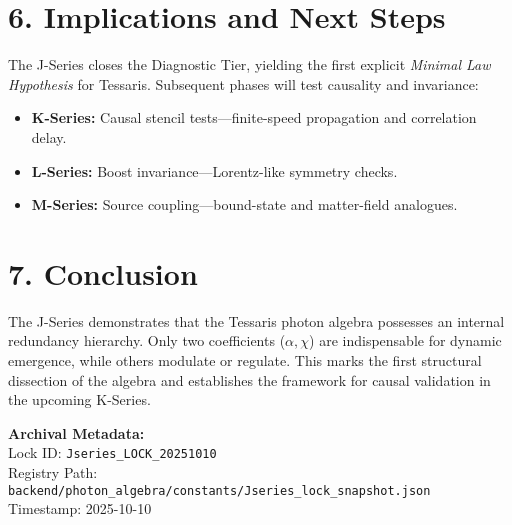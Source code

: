 \documentclass[12pt]{article}
\begin{document}
\section*{6. Implications and Next Steps}

The J-Series closes the Diagnostic Tier, yielding the first explicit \emph{Minimal Law Hypothesis} for Tessaris.
Subsequent phases will test causality and invariance:

\begin{itemize}
  \item \textbf{K-Series:} Causal stencil tests—finite-speed propagation and correlation delay.
  \item \textbf{L-Series:} Boost invariance—Lorentz-like symmetry checks.
  \item \textbf{M-Series:} Source coupling—bound-state and matter-field analogues.
\end{itemize}

\section*{7. Conclusion}

The J-Series demonstrates that the Tessaris photon algebra possesses an internal redundancy hierarchy.
Only two coefficients (\(\alpha, \chi\)) are indispensable for dynamic emergence, while others modulate or regulate.
This marks the first structural dissection of the algebra and establishes the framework for causal validation in the upcoming K-Series.

\vspace{1em}
\noindent\textbf{Archival Metadata:}\\
Lock ID: \texttt{Jseries\_LOCK\_20251010}\\
Registry Path: \texttt{backend/photon\_algebra/constants/Jseries\_lock\_snapshot.json}\\
Timestamp: 2025-10-10
\end{document}
